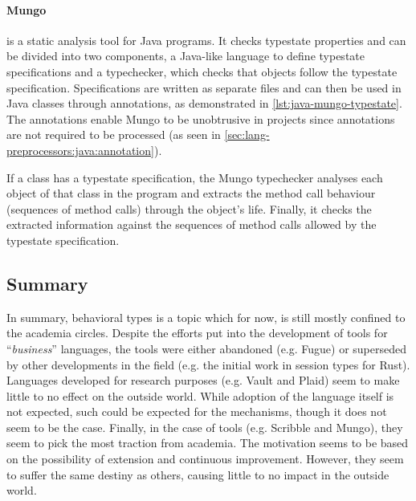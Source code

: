 \paragraph{Mungo} is a static analysis tool \autocite{Dardha2017, Kouzapas2018, Voinea2020} for Java programs.
It checks typestate properties and can be divided into two components, a Java-like language to define typestate specifications
and a typechecker, which checks that objects follow the typestate specification.
Specifications are written as separate files and can then be used in Java classes through annotations, as demonstrated in \autoref{lst:java-mungo-typestate}.
The annotations enable Mungo to be unobtrusive in projects since annotations are not required to be processed (as seen in \autoref{sec:lang-preprocessors:java:annotation}).
\begin{displayquote}
	If a class has a typestate specification, the Mungo typechecker analyses each object of that class in the program and extracts the method call behaviour (sequences of method calls) through
	the object’s life. Finally, it checks the extracted information against the sequences of method calls allowed by the typestate specification.
\end{displayquote}



\subsection{Summary}

In summary, behavioral types is a topic which for now, is still mostly confined to the academia circles.
Despite the efforts put into the development of tools for “\emph{business}” languages,
the tools were either abandoned (e.g. Fugue) or
superseded by other developments in the field (e.g. the initial work in session types for Rust).
Languages developed for research purposes (e.g. Vault and Plaid) seem to make little to no effect on the outside world.
While adoption of the language itself is not expected, such could be expected for the mechanisms,
though it does not seem to be the case.
Finally, in the case of tools (e.g. Scribble and Mungo), they seem to pick the most traction from academia.
The motivation seems to be based on the possibility of extension and continuous improvement.
However, they seem to suffer the same destiny as others, causing little to no impact in the outside world.